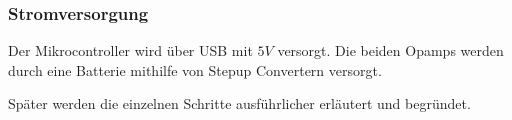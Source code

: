 \subsubsection{Stromversorgung}
Der Mikrocontroller wird über USB mit $5V$ versorgt.
Die beiden Opamps werden durch eine Batterie mithilfe von Stepup Convertern versorgt.

Später werden die einzelnen Schritte ausführlicher erläutert und begründet.



